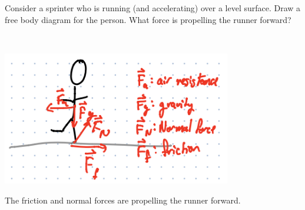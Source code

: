 Consider a sprinter who is running (and accelerating) over a level surface. Draw a free body diagram for the person. What force is propelling the runner forward?

\begin{solution}\
\begin{center}
    \includegraphics[width=0.75\textwidth]{img/e7p1.png}
\end{center}

The friction and normal forces are propelling the runner forward.
\end{solution}